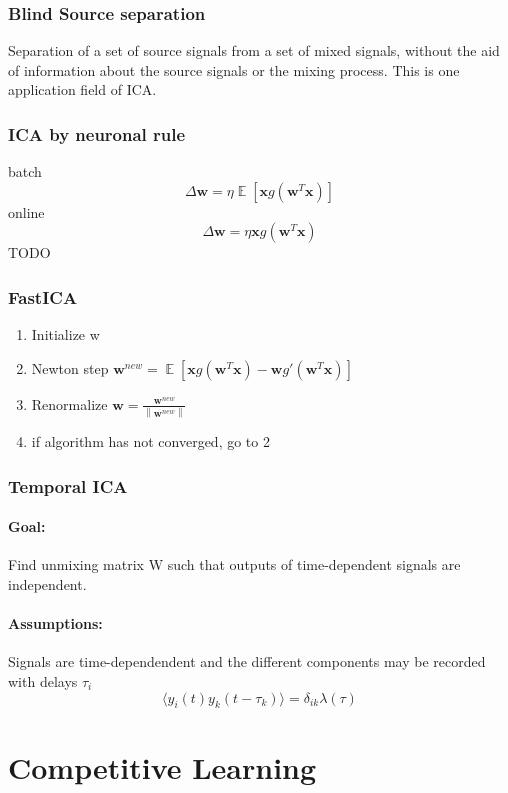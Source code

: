 \documentclass[11pt]{article}
\DeclareMathOperator{\E}{\mathbb{E}}
\newcommand{\vectornorm}[1]{\left\|#1\right\|}
\begin{document}
\subsubsection{Blind Source separation}
Separation of a set of source signals from a set of mixed signals, without the aid of information about the source signals or the mixing process. This is one application field of ICA.

\subsubsection{ICA by neuronal rule}
batch
\[
\Delta \mathbf{w}=\eta\E\left[\mathbf{x}g(\mathbf{w}^T\mathbf{x})\right]
\]
online
\[
\Delta \mathbf{w}=\eta \mathbf{x} g(\mathbf{w}^T\mathbf{x})
\]
\textsc{TODO}

\subsubsection{FastICA}
\begin{enumerate}
\item Initialize w
\item Newton step $\mathbf{w}^{new}=\E \left[\mathbf{x}g(\mathbf{w}^T\mathbf{x})-\mathbf{w}g'(\mathbf{w}^T\mathbf{x})\right]$
\item Renormalize $\mathbf{w}=\frac{\mathbf{w}^{new}}{\vectornorm{\mathbf{w}^{new}}}$
\item if algorithm has not converged, go to 2
\end{enumerate}
\subsubsection{Temporal ICA}
\paragraph{Goal:} Find unmixing matrix W such that outputs of time-dependent signals are independent. 
\paragraph{Assumptions:} Signals are time-dependendent and the different components may be recorded with delays $\tau_i$
\[
	\langle y_i(t)y_k(t-\tau_k) \rangle = \delta_{ik}\lambda(\tau)
\]
\section{Competitive Learning}
\end{document}
